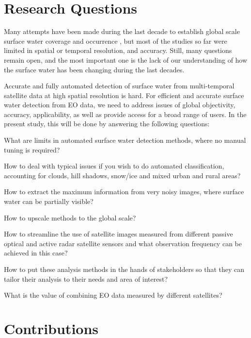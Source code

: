 \section{Research Questions}


Many attempts have been made during the last decade to establish global scale surface water coverage and occurrence \citet{nasa2003water, lehner2004development, feng2016global, yamazaki2015development}, but most of the studies so far were limited in spatial or temporal resolution, and accuracy. Still, many questions remain open, and the most important one is the lack of our understanding of how the surface water has been changing during the last decades.

Accurate and fully automated detection of surface water from multi-temporal satellite data at high spatial resolution is hard. For efficient and accurate surface water detection from EO data, we need to address issues of global objectivity, accuracy, applicability, as well as provide access for a broad range of users. In the present study, this will be done by answering the following questions:

What are limits in automated surface water detection methods, where no manual tuning is required?

How to deal with typical issues if you wish to do automated classification, accounting for clouds, hill shadows, snow/ice and mixed urban and rural areas?

How to extract the maximum information from very noisy images, where surface water can be partially visible?

How to upscale methods to the global scale?

How to streamline the use of satellite images measured from different passive optical and active radar satellite sensors and what observation frequency can be achieved in this case? 

How to put these analysis methods in the hands of stakeholders so that they can tailor their analysis to their needs and area of interest?

What is the value of combining EO data measured by different satellites?


\bigskip

\section{Contributions}

